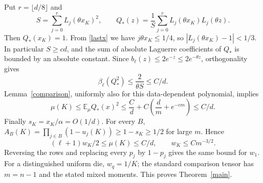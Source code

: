 \documentclass[11pt]{article}
\newcommand{\E}{\mathbb E}
\begin{document}
Put $r=\lfloor d/8\rfloor$ and
\[
 S=\sum_{j=0}^{r}L_j(\theta x_K)^2,
 \qquad Q_*(z)=\frac1S\sum_{j=0}^{r}
              L_j(\theta x_K)L_j(\theta z).
\]
Then $Q_*(x_K)=1$. From \eqref{lastx} we have
$j\theta x_K\le1/4$, so $|L_j(\theta x_K)-1|<1/3$.
In particular $S\ge c d$, and the sum of absolute Laguerre
coefficients of $Q_*$ is bounded by an absolute constant.
Since $b_\ell(z)\le2e^{-z}\le2e^{-\theta z}$,
orthogonality gives
\[
 \beta_\ell(Q_*^2)\le\frac2{\theta S}\le C/d.
\]
Lemma~\ref{comparison}, uniformly also for this data-dependent
polynomial, implies
\[
 \mu(K)\le\E_\mu Q_*(x)^2
 \le \frac Cd+C\left(\frac d m+e^{-cm}\right)
 \le C/d.
\]
Finally $s_K=x_K/\alpha=O(1/d)$. For every $B$,
$A_B(K)=\prod_{j\in B}(1-u_j(K))\ge1-s_K\ge1/2$ for large $m$.
Hence
\[
 (\ell+1)w_K/2\le\mu(K)\le C/d,
 \qquad w_K\le C m^{-3/2}.
\]
Reversing the rows and replacing every $p_j$ by $1-p_j$ gives the
same bound for $w_1$. For a distinguished uniform die, $w_q=1/K$;
the standard comparison tensor has $m=n-1$ and the stated mixed moments.
This proves Theorem~\ref{main}.
\end{document}
